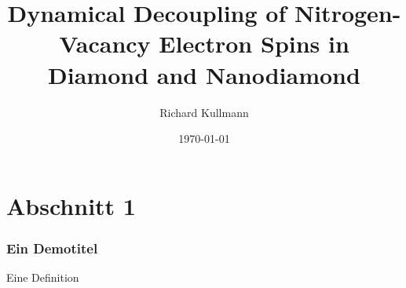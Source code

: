 \documentclass{beamer}
\title{Dynamical Decoupling of Nitrogen-Vacancy Electron Spins in Diamond and Nanodiamond}
\author{Richard Kullmann}
\date{\today}
\begin{document}
\maketitle
\frame{\tableofcontents[currentsection]}

\section{Abschnitt 1}
\begin{frame} %
  \frametitle{Ein Demotitel} %
  \begin{Definition} %
    Eine Definition
  \end{Definition}
\end{frame}
\end{document}
